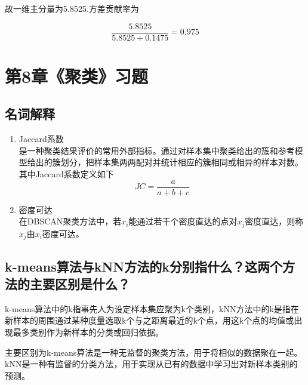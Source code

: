 \documentclass{ctexart}
\begin{document}
故一维主分量为5.8525.方差贡献率为

\begin{equation*}
\dfrac{5.8525}{5.8525+0.1475}=0.975
\end{equation*}

\section*{第8章《聚类》习题}
\subsection*{名词解释}
\begin{enumerate}[(1)]
\item Jaccard系数\\
是一种聚类结果评价的常用外部指标。通过对样本集中聚类给出的簇和参考模型给出的簇划分，把样本集两两配对并统计相应的簇相同或相异的样本对数。其中Jaccard系数定义如下
\begin{equation*}
JC=\frac{a}{a+b+c}
\end{equation*}
\item 密度可达\\
在DBSCAN聚类方法中，若$x_i$能通过若干个密度直达的点对$x_j$密度直达，则称$x_j$由$x_i$密度可达。
\end{enumerate}

\subsection*{k-means算法与kNN方法的k分别指什么？这两个方法的主要区别是什么？}
k-means算法中的k指事先人为设定样本集应聚为k个类别，kNN方法中的k是指在新样本的周围通过某种度量选取k个与之距离最近的k个点，用这k个点的均值或出现最多类别作为新样本的分类或回归依据。

主要区别为k-means算法是一种无监督的聚类方法，用于将相似的数据聚在一起。kNN是一种有监督的分类方法，用于实现从已有的数据中学习出对新样本类别的预测。
\end{document}
